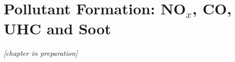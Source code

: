 \chapter{Pollutant Formation: \texorpdfstring{NO$_x$}{NOx}, CO, UHC and Soot}\label{ch:emissions}

\emph{[chapter in preparation]}
